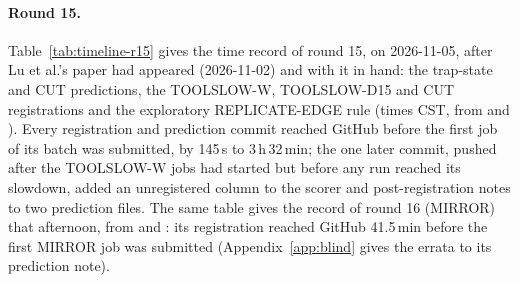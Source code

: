 \paragraph{Round 15.} Table~\ref{tab:timeline-r15} gives the time record of round 15, on 2026-11-05, after Lu et al.'s paper had appeared (2026-11-02) and with it in hand: the trap-state and CUT predictions, the TOOLSLOW-W, TOOLSLOW-D15 and CUT registrations and the exploratory REPLICATE-EDGE rule (times CST, from  and ). Every registration and prediction commit reached GitHub before the first job of its batch was submitted, by 145\,s to 3\,h\,32\,min; the one later commit, pushed after the TOOLSLOW-W jobs had started but before any run reached its slowdown, added an unregistered column to the scorer and post-registration notes to two prediction files. The same table gives the record of round 16 (MIRROR) that afternoon, from  and : its registration reached GitHub 41.5\,min before the first MIRROR job was submitted (Appendix~\ref{app:blind} gives the errata to its prediction note).

